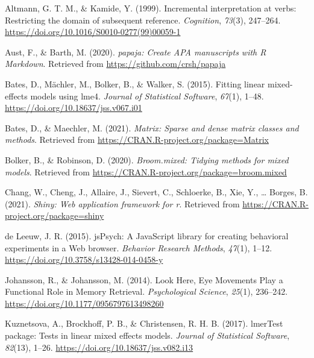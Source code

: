 \documentclass[
  english,
  man,floatsintext]{apa6}
\newlength{\cslhangindent}
\newlength{\cslentryspacingunit} %
\newenvironment{CSLReferences}[2] %
 {%
  \setlength{\parindent}{0pt}
  \ifodd #1
  \let\oldpar\par
  \def\par{\hangindent=\cslhangindent\oldpar}
  \fi
  \setlength{\parskip}{#2\cslentryspacingunit}
 }%
 {}
\begin{document}
\hypertarget{refs}{}
\begin{CSLReferences}{1}{0}
\leavevmode{}%
Altmann, G. T. M., \& Kamide, Y. (1999). Incremental interpretation at verbs: Restricting the domain of subsequent reference. \emph{Cognition}, \emph{73}(3), 247--264. \url{https://doi.org/10.1016/S0010-0277(99)00059-1}

\leavevmode{}%
Aust, F., \& Barth, M. (2020). \emph{{papaja}: {Create} {APA} manuscripts with {R Markdown}}. Retrieved from \url{https://github.com/crsh/papaja}

\leavevmode{}%
Bates, D., Mächler, M., Bolker, B., \& Walker, S. (2015). Fitting linear mixed-effects models using {lme4}. \emph{Journal of Statistical Software}, \emph{67}(1), 1--48. \url{https://doi.org/10.18637/jss.v067.i01}

\leavevmode{}%
Bates, D., \& Maechler, M. (2021). \emph{Matrix: Sparse and dense matrix classes and methods}. Retrieved from \url{https://CRAN.R-project.org/package=Matrix}

\leavevmode{}%
Bolker, B., \& Robinson, D. (2020). \emph{Broom.mixed: Tidying methods for mixed models}. Retrieved from \url{https://CRAN.R-project.org/package=broom.mixed}

\leavevmode{}%
Chang, W., Cheng, J., Allaire, J., Sievert, C., Schloerke, B., Xie, Y., \ldots{} Borges, B. (2021). \emph{Shiny: Web application framework for r}. Retrieved from \url{https://CRAN.R-project.org/package=shiny}

\leavevmode{}%
de Leeuw, J. R. (2015). {jsPsych}: {A JavaScript} library for creating behavioral experiments in a {Web} browser. \emph{Behavior Research Methods}, \emph{47}(1), 1--12. \url{https://doi.org/10.3758/s13428-014-0458-y}

\leavevmode{}%
Johansson, R., \& Johansson, M. (2014). Look {Here}, {Eye Movements Play} a {Functional Role} in {Memory Retrieval}. \emph{Psychological Science}, \emph{25}(1), 236--242. \url{https://doi.org/10.1177/0956797613498260}

\leavevmode{}%
Kuznetsova, A., Brockhoff, P. B., \& Christensen, R. H. B. (2017). {lmerTest} package: Tests in linear mixed effects models. \emph{Journal of Statistical Software}, \emph{82}(13), 1--26. \url{https://doi.org/10.18637/jss.v082.i13}


\end{CSLReferences}
\end{document}
